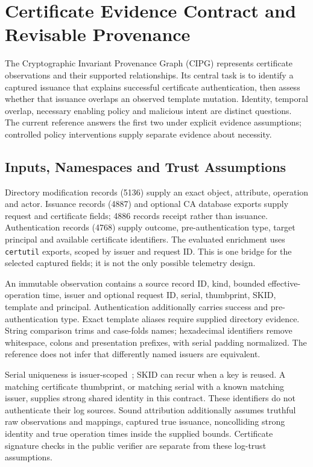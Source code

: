\section{Certificate Evidence Contract and Revisable Provenance}
\label{sec:cipg_provenance}

The Cryptographic Invariant Provenance Graph (CIPG) represents certificate observations and their supported relationships. Its central task is to identify a captured issuance that explains successful certificate authentication, then assess whether that issuance overlaps an observed template mutation. Identity, temporal overlap, necessary enabling policy and malicious intent are distinct questions. The current reference answers the first two under explicit evidence assumptions; controlled policy interventions supply separate evidence about necessity.

\subsection{Inputs, Namespaces and Trust Assumptions}
Directory modification records (5136) supply an exact object, attribute, operation and actor. Issuance records (4887) and optional CA database exports supply request and certificate fields; 4886 records receipt rather than issuance. Authentication records (4768) supply outcome, pre-authentication type, target principal and available certificate identifiers. The evaluated enrichment uses \texttt{certutil} exports, scoped by issuer and request ID. This is one bridge for the selected captured fields; it is not the only possible telemetry design.

An immutable observation contains a source record ID, kind, bounded effective-operation time, issuer and optional request ID, serial, thumbprint, SKID, template and principal. Authentication additionally carries success and pre-authentication type. Exact template aliases require supplied directory evidence. String comparison trims and case-folds names; hexadecimal identifiers remove whitespace, colons and presentation prefixes, with serial padding normalized. The reference does not infer that differently named issuers are equivalent.

Serial uniqueness is issuer-scoped~\cite{rfc5280}; SKID can recur when a key is reused. A matching certificate thumbprint, or matching serial with a known matching issuer, supplies strong shared identity in this contract. These identifiers do not authenticate their log sources. Sound attribution additionally assumes truthful raw observations and mappings, captured true issuance, noncolliding strong identity and true operation times inside the supplied bounds. Certificate signature checks in the public verifier are separate from these log-trust assumptions.

